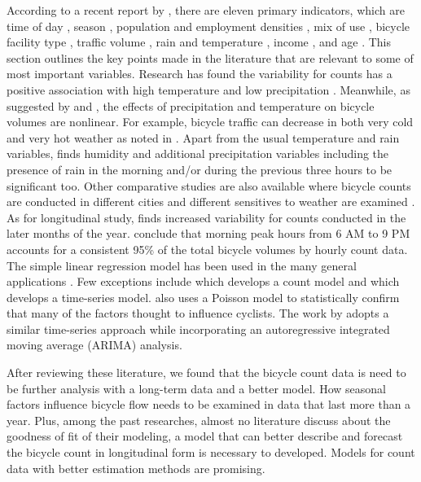 \documentclass[12pt,letterpaper,article,twocolumn]{memoir}
\begin{document}
According to a recent report by \cite{Bassok:2011aa}, there are eleven
primary indicators, which are time of day \cite{Schwartz:1999aa},
season \cite{Niemeier:1996aa}, population and employment densities
\cite{McCahil:2008aa,Pinjari:2009aa}, mix of use
\cite{Pinjari:2009aa}, bicycle facility type \cite{Hunt:2007aa},
traffic volume \cite{McDonald:2007aa}, rain and temperature
\cite{Niemeier:1996aa,Parkin:2008aa}, income \cite{Turner:1998aa}, and
age \cite{Hunt:2007aa}. This section outlines the key points made in
the literature that are relevant to some of most important variables.
Research has found the variability for counts has a positive
association with high temperature and low precipitation
\cite{Niemeier:1996aa,Parkin:2008aa}. Meanwhile, as suggested by
\cite{Lewin:2011aa} and \cite{Thomas:2009aa}, the effects of
precipitation and temperature on bicycle volumes are nonlinear. For
example, bicycle traffic can decrease in both very cold and very hot
weather as noted in \cite{Richardson:2000aa}. Apart from the usual
temperature and rain variables, \cite{Miranda-Moreno:2011aa} finds
humidity and additional precipitation variables including the presence
of rain in the morning and/or during the previous three hours to be
significant too. Other comparative studies are also available where
bicycle counts are conducted in different cities and different
sensitives to weather are examined \cite{Rose:2011aa}. As for
longitudinal study, \cite{Niemeier:1996aa} finds increased variability
for counts conducted in the later months of the year.
\cite{Jones:2010aa} conclude that morning peak hours from 6 AM to 9 PM
accounts for a consistent 95\% of the total bicycle volumes by hourly
count data. The simple linear regression model has been used in the
many general applications \cite{Jones:2008aa,Jones:2010aa}. Few
exceptions include \cite{Miranda-Moreno:2011aa} which develops a count
model and \cite{Thomas:2009aa} which develops a time-series model.
\cite{Niemeier:1996aa} also uses a Poisson model to statistically
confirm that many of the factors thought to influence cyclists. The
work by \cite{Gallop:2012aa} adopts a similar time-series approach
while incorporating an autoregressive integrated moving average
(ARIMA) analysis.

After reviewing these literature, we found that the bicycle count data
is need to be further analysis with a long-term data and a better
model. How seasonal factors influence bicycle flow needs to be
examined in data that last more than a year. Plus, among the past
researches, almost no literature discuss about the goodness of fit of
their modeling, a model that can better describe and forecast the
bicycle count in longitudinal form is necessary to developed. Models
for count data with better estimation methods are promising.
\end{document}
